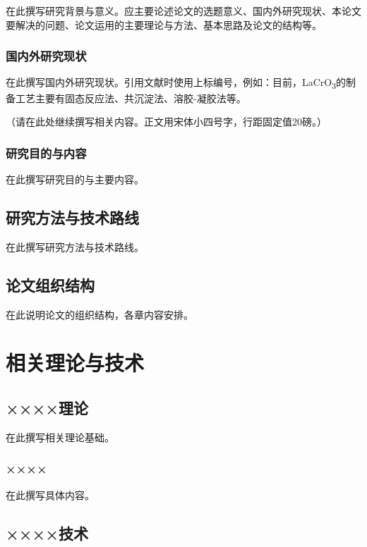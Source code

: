 \documentclass[12pt, a4paper, openany]{ltjbook}
\begin{document}
在此撰写研究背景与意义。应主要论述论文的选题意义、国内外研究现状、本论文要解决的问题、论文运用的主要理论与方法、基本思路及论文的结构等。

\subsection{国内外研究现状}

在此撰写国内外研究现状。引用文献时使用上标编号，例如：目前，LaCrO\textsubscript{3}的制备工艺主要有固态反应法\cite{ref1}、共沉淀法\cite{ref2}、溶胶-凝胶法\cite{ref3}等。

（请在此处继续撰写相关内容。正文用宋体小四号字，行距固定值20磅。）

\subsection{研究目的与内容}

在此撰写研究目的与主要内容。

\section{研究方法与技术路线}

在此撰写研究方法与技术路线。

\section{论文组织结构}

在此说明论文的组织结构，各章内容安排。

\chapter{相关理论与技术}

\section{××××理论}

在此撰写相关理论基础。

\subsection{××××}

在此撰写具体内容。

\section{××××技术}
\end{document}

